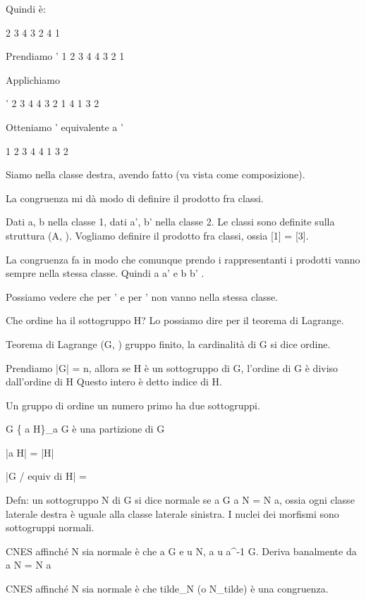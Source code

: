 Quindi \mu \`e:

 2 3 4
3 2 4 1

Prendiamo \tau'
1 2 3 4
4 3 2 1

Applichiamo \sigma

\tau'  2 3 4
4 3 2 1
4 1 3 2

Otteniamo \mu' equivalente a \tau'

1 2 3 4
4 1 3 2


Siamo nella classe destra, avendo fatto \sigma \tau (va vista come composizione).

La congruenza mi d\`a modo di definire il prodotto fra classi. 

Dati a, b nella classe 1, dati a', b' nella classe 2. Le classi sono definite sulla struttura (A, \cdot). Vogliamo definire il prodotto fra classi, ossia [1] \cdot [2] = [3]. 

La congruenza fa in modo che comunque prendo i rappresentanti i prodotti vanno sempre nella stessa classe. Quindi a \cdot a' e b \cdot b' \in [3].

Possiamo vedere che \tau per \tau' e \mu per \mu' non vanno nella stessa classe.

Che ordine ha il sottogruppo H? Lo possiamo dire per il teorema di Lagrange.

Teorema di Lagrange
(G, \cdot) gruppo finito, la cardinalit\`a di G si dice ordine.

Prendiamo |G| = n, allora se H \`e un sottogruppo di G, l'ordine di G \`e diviso dall'ordine di H
Questo intero \`e detto indice di H.

Un gruppo di ordine un numero primo ha due sottogruppi.

G \to \{ a H\}_{a \in G}
\`e una partizione di G

|a H| = |H|

|G / equiv di H| = 

Defn:
un sottogruppo N di G si dice normale se \forall a \in G a N = N a, ossia ogni classe laterale destra \`e uguale alla classe laterale sinistra. I nuclei dei morfismi sono sottogruppi normali.

CNES affinch\'e N sia normale \`e che \forall a \in G e \forall u \in N, a \cdot u \cdot a^{-1} \in G. Deriva banalmente da a \cdot N = N \cdot a

CNES affinch\'e N sia normale \`e che tilde_N (o N_tilde) \`e una congruenza.

